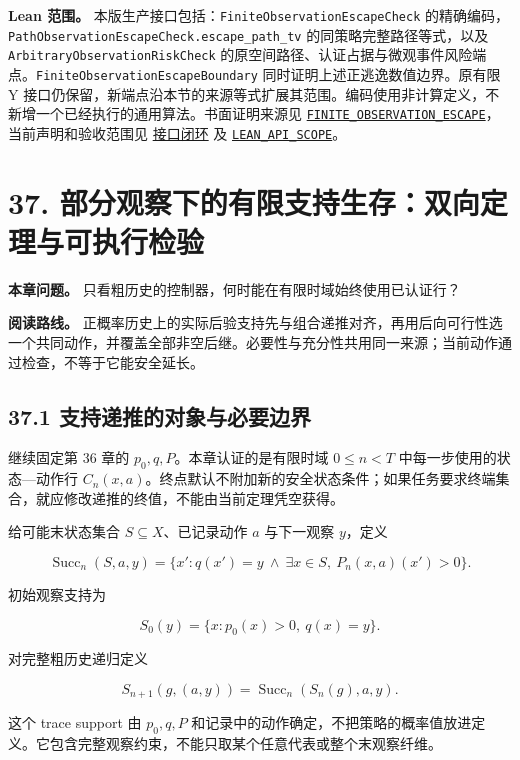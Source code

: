 \documentclass[
  11pt,
  oneside]{book}
\begin{document}
\textbf{Lean 范围。} 本版生产接口包括：\nolinkurl{FiniteObservationEscapeCheck} 的精确编码，\nolinkurl{PathObservationEscapeCheck.escape_path_tv} 的同策略完整路径等式，以及 \nolinkurl{ArbitraryObservationRiskCheck} 的原空间路径、认证占据与微观事件风险端点。\nolinkurl{FiniteObservationEscapeBoundary} 同时证明上述正逃逸数值边界。原有限 Y 接口仍保留，新端点沿本节的来源等式扩展其范围。编码使用非计算定义，不新增一个已经执行的通用算法。书面证明来源见 \href{../formalization/ueot-core/docs/compression/theory_completion/unified_closure/interface_research_v1/FINITE_OBSERVATION_ESCAPE.md}{\nolinkurl{FINITE_OBSERVATION_ESCAPE}}，当前声明和验收范围见 \href{../formalization/ueot-core/docs/compression/theory_completion/unified_closure/REGISTERED_INTERFACES_CLOSURE_V1.md}{接口闭环} 及 \href{LEAN_API_SCOPE.md}{\nolinkurl{LEAN_API_SCOPE}}。

\chapter{37. 部分观察下的有限支持生存：双向定理与可执行检验}\label{ch-37}

\textbf{本章问题。} 只看粗历史的控制器，何时能在有限时域始终使用已认证行？

\textbf{阅读路线。} 正概率历史上的实际后验支持先与组合递推对齐，再用后向可行性选一个共同动作，并覆盖全部非空后继。必要性与充分性共用同一来源；当前动作通过检查，不等于它能安全延长。

\section{37.1 支持递推的对象与必要边界}\label{ux652fux6301ux9012ux63a8ux7684ux5bf9ux8c61ux4e0eux5fc5ux8981ux8fb9ux754c}

继续固定第 36 章的 \(p_0,q,P\)。本章认证的是有限时域 \(0\le n<T\) 中每一步使用的状态---动作行 \(C_n(x,a)\)。终点默认不附加新的安全状态条件；如果任务要求终端集合，就应修改递推的终值，不能由当前定理凭空获得。

给可能末状态集合 \(S\subseteq X\)、已记录动作 \(a\) 与下一观察 \(y\)，定义

\[\operatorname{Succ}_n(S,a,y)=
\{x':q(x')=y\ \land\
\exists x\in S,\ P_n(x,a)(x')>0\}.\]

初始观察支持为

\[S_0(y)=\{x:p_0(x)>0,\ q(x)=y\}.\]

对完整粗历史递归定义

\[S_{n+1}(g,(a,y))=\operatorname{Succ}_n(S_n(g),a,y).\]

这个 trace support 由 \(p_0,q,P\) 和记录中的动作确定，不把策略的概率值放进定义。它包含完整观察约束，不能只取某个任意代表或整个末观察纤维。
\end{document}
